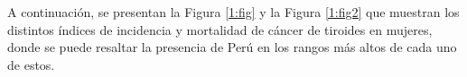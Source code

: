 	A continuación, se presentan la Figura \ref{1:fig} y la Figura \ref{1:fig2} que muestran los distintos índices de incidencia y mortalidad de cáncer de tiroides en mujeres, donde se puede resaltar la presencia de Perú en los rangos más altos de cada uno de estos. 

